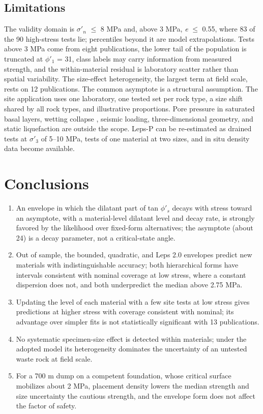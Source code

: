 \documentclass[Journal,letterpaper]{ascelike-new}
\begin{document}
\subsection{Limitations}
The validity domain is $\sigma'_n$ $\le$ 8 MPa and, above 3 MPa, \textit{e} $\le$ 0.55, where 83 of the 90 high-stress tests lie; percentiles beyond it are model extrapolations. Tests above 3 MPa come from eight publications, the lower tail of the population is truncated at $\phi'_1$ = 31\textdegree{}, class labels may carry information from measured strength, and the within-material residual is laboratory scatter rather than spatial variability. The size-effect heterogeneity, the largest term at field scale, rests on 12 publications. The common asymptote is a structural assumption. The site application uses one laboratory, one tested set per rock type, a size shift shared by all rock types, and illustrative proportions. Pore pressure in saturated basal layers, wetting collapse \cite{oldecop2001}, seismic loading, three-dimensional geometry, and static liquefaction are outside the scope. Leps-P can be re-estimated as drained tests at $\sigma'_3$ of 5--10 MPa, tests of one material at two sizes, and in situ density data become available.

\section{Conclusions}
\begin{enumerate}
\item An envelope in which the dilatant part of tan $\phi'_s$ decays with stress toward an asymptote, with a material-level dilatant level and decay rate, is strongly favored by the likelihood over fixed-form alternatives; the asymptote (about 24\textdegree{}) is a decay parameter, not a critical-state angle.
\item Out of sample, the bounded, quadratic, and Leps 2.0 envelopes predict new materials with indistinguishable accuracy; both hierarchical forms have intervals consistent with nominal coverage at low stress, where a constant dispersion does not, and both underpredict the median above 2.75 MPa.
\item Updating the level of each material with a few site tests at low stress gives predictions at higher stress with coverage consistent with nominal; its advantage over simpler fits is not statistically significant with 13 publications.
\item No systematic specimen-size effect is detected within materials; under the adopted model its heterogeneity dominates the uncertainty of an untested waste rock at field scale.
\item For a 700 m dump on a competent foundation, whose critical surface mobilizes about 2 MPa, placement density lowers the median strength and size uncertainty the cautious strength, and the envelope form does not affect the factor of safety.
\end{enumerate}
\end{document}
